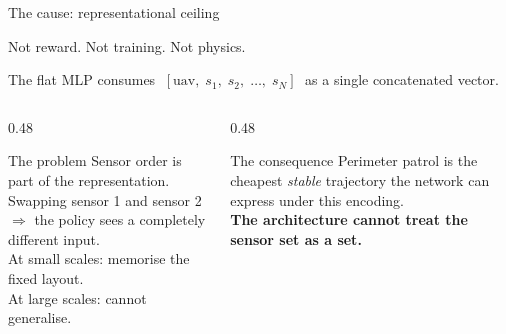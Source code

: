 \documentclass[aspectratio=169,11pt]{beamer}
\newcommand{\emp}[1]{{\color{manpurple}\textbf{#1}}}
\begin{document}
\begin{frame}{The cause: representational ceiling}
  \vspace{0.4em}
  \begin{block}{}
    \large\centering Not reward. \quad Not training. \quad Not physics.
  \end{block}
  \vspace{0.8em}
  The flat MLP consumes \(\;[\mathrm{uav},\; s_1,\; s_2,\; \ldots,\; s_N]\;\)
  as a single concatenated vector.\\[0.7em]

  \begin{columns}[T]
    \begin{column}{0.48\textwidth}
      \begin{block}{The problem}
        \small
        Sensor order is part of the representation.\\
        Swapping sensor 1 and sensor 2 $\Rightarrow$ the policy
        sees a completely different input.\\[0.3em]
        At small scales: memorise the fixed layout.\\
        At large scales: cannot generalise.
      \end{block}
    \end{column}
    \begin{column}{0.48\textwidth}
      \begin{block}{The consequence}
        \small
        Perimeter patrol is the cheapest \emph{stable}
        trajectory the network can express under this
        encoding.\\[0.3em]
        \emp{The architecture cannot treat the sensor
        set as a set.}
      \end{block}
    \end{column}
  \end{columns}
\end{frame}
\end{document}

